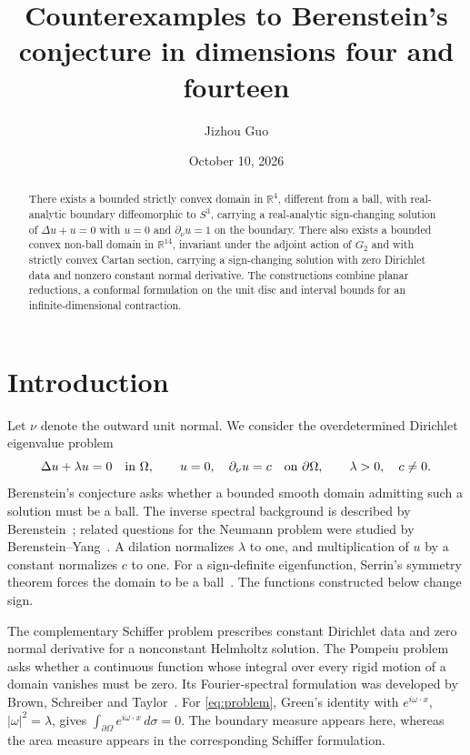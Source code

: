 \documentclass[11pt]{amsart}
\theoremstyle{remark}
\numberwithin{equation}{section}
\newcommand{\R}{\mathbb R}
\newcommand{\abs}[1]{\lvert#1\rvert}
\begin{document}
\title{Counterexamples to Berenstein's conjecture in dimensions four and fourteen}
\author{Jizhou Guo}
\date{October 10, 2026}
\begin{abstract}
There exists a bounded strictly convex domain in $\R^4$, different from a
ball, with real-analytic boundary diffeomorphic to $S^3$, carrying a
real-analytic sign-changing solution of $\Delta u+u=0$ with $u=0$ and
$\partial_\nu u=1$ on the boundary. There also exists a bounded convex
non-ball domain in $\R^{14}$, invariant under the adjoint action of $G_2$
and with strictly convex Cartan section, carrying a sign-changing solution
with zero Dirichlet data and nonzero constant normal derivative.
The constructions combine planar reductions, a conformal formulation on
the unit disc and interval bounds for an infinite-dimensional contraction.
\end{abstract}
\maketitle
\raggedbottom

\section{Introduction}
Let $\nu$ denote the outward unit normal. We consider the overdetermined
Dirichlet eigenvalue problem
\begin{equation}\label{eq:problem}
 \Delta u+\lambda u=0\quad\hbox{in }\Omega,\qquad
 u=0,\quad \partial_\nu u=c\quad\hbox{on }\partial\Omega,
 \qquad \lambda>0,\quad c\ne0.
\end{equation}
Berenstein's conjecture asks whether a bounded smooth domain admitting
such a solution must be a ball. The inverse spectral background is described by Berenstein~\cite{Berenstein1980}; related questions for the Neumann problem were studied by Berenstein--Yang~\cite{BerensteinYang1987}. A dilation normalizes
$\lambda$ to one, and multiplication of $u$ by a constant normalizes $c$
to one. For a sign-definite eigenfunction, Serrin's symmetry theorem
forces the domain to be a ball~\cite{Serrin1971}. The functions constructed
below change sign.

The complementary Schiffer problem prescribes constant Dirichlet data
and zero normal derivative for a nonconstant Helmholtz solution.
The Pompeiu problem asks whether a continuous function whose integral
over every rigid motion of a domain vanishes must be zero. Its
Fourier-spectral formulation was developed by Brown, Schreiber and
Taylor~\cite{BrownSchreiberTaylor1973}. For \eqref{eq:problem}, Green's
identity with $e^{i\omega\cdot x}$, $\abs{\omega}^2=\lambda$, gives
$\int_{\partial\Omega}e^{i\omega\cdot x}\,d\sigma=0$. The boundary measure
appears here, whereas the area measure appears in the corresponding
Schiffer formulation.
\end{document}
